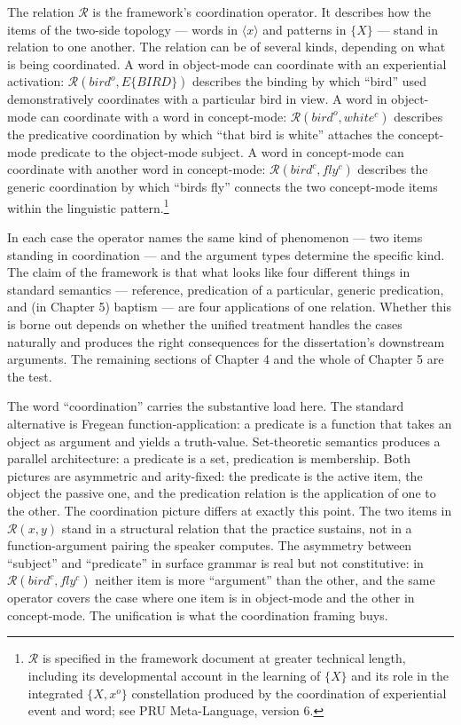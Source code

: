 \documentclass[12pt,a4paper]{article}
\begin{document}
The relation \(\mathcal{R}\) is the framework's coordination operator. It describes how the items of the two-side topology --- words in \(\langle x \rangle\) and patterns in \(\{X\}\) --- stand in relation to one another. The relation can be of several kinds, depending on what is being coordinated. A word in object-mode can coordinate with an experiential activation: \(\mathcal{R}(bird^o, E\{BIRD\})\) describes the binding by which ``bird'' used demonstratively coordinates with a particular bird in view. A word in object-mode can coordinate with a word in concept-mode: \(\mathcal{R}(bird^o, white^c)\) describes the predicative coordination by which ``that bird is white'' attaches the concept-mode predicate to the object-mode subject. A word in concept-mode can coordinate with another word in concept-mode: \(\mathcal{R}(bird^c, fly^c)\) describes the generic coordination by which ``birds fly'' connects the two concept-mode items within the linguistic pattern.\footnote{\(\mathcal{R}\) is specified in the framework document at greater technical length, including its developmental account in the learning of \(\{X\}\) and its role in the integrated \(\{X, x^o\}\) constellation produced by the coordination of experiential event and word; see PRU Meta-Language, version 6.}

In each case the operator names the same kind of phenomenon --- two items standing in coordination --- and the argument types determine the specific kind. The claim of the framework is that what looks like four different things in standard semantics --- reference, predication of a particular, generic predication, and (in Chapter 5) baptism --- are four applications of one relation. Whether this is borne out depends on whether the unified treatment handles the cases naturally and produces the right consequences for the dissertation's downstream arguments. The remaining sections of Chapter 4 and the whole of Chapter 5 are the test.

The word ``coordination'' carries the substantive load here. The standard alternative is Fregean function-application: a predicate is a function that takes an object as argument and yields a truth-value. Set-theoretic semantics produces a parallel architecture: a predicate is a set, predication is membership. Both pictures are asymmetric and arity-fixed: the predicate is the active item, the object the passive one, and the predication relation is the application of one to the other. The coordination picture differs at exactly this point. The two items in \(\mathcal{R}(x, y)\) stand in a structural relation that the practice sustains, not in a function-argument pairing the speaker computes. The asymmetry between ``subject'' and ``predicate'' in surface grammar is real but not constitutive: in \(\mathcal{R}(bird^c, fly^c)\) neither item is more ``argument'' than the other, and the same operator covers the case where one item is in object-mode and the other in concept-mode. The unification is what the coordination framing buys.
\end{document}
